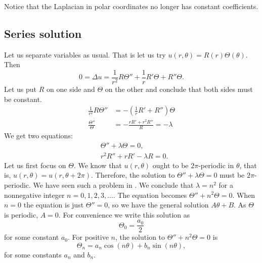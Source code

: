 Notice that the Laplacian in polar coordinates no longer has constant
coefficients.

\subsection{Series solution}

Let us separate variables as usual.  That is let us try
$u(r,\theta) = R(r)\Theta(\theta)$.  Then
\begin{equation*}
0 = \Delta u = 
\frac{1}{r^2} R \Theta''
+
\frac{1}{r} R' \Theta
+
R'' \Theta .
\end{equation*}
Let us put $R$ on one side and $\Theta$ on the other and conclude
that both sides must be constant.
\begin{align*}
\frac{1}{r^2} R \Theta''
& =
-
\left(\frac{1}{r} R' + R''\right) \Theta 
\\
\frac{\Theta''}{\Theta}
& =
-
\frac{r R' + r^2 R''}{R} = -\lambda
\end{align*}
We get two equations:
\begin{align*}
& \Theta'' + \lambda \Theta = 0 ,
\\
& r^2 R'' + r R' -\lambda R = 0.
\end{align*}
Let us first focus on $\Theta$.  We know that $u(r,\theta)$ ought to be
$2\pi$-periodic in $\theta$, that is,
$u(r,\theta) = u(r,\theta+2\pi)$.  Therefore, the solution to
$\Theta'' + \lambda \Theta = 0$ must be $2\pi$-periodic.
We have seen such a problem in .
We conclude
that
$\lambda = n^2$ for a
nonnegative integer $n=0,1,2,3,\ldots$.  The equation becomes
$\Theta'' + n^2 \Theta = 0$.  When $n=0$ the equation is just
$\Theta'' = 0$, so we have the general solution $A \theta + B$.  As
$\Theta$ is periodic,
$A=0$.
For convenience we write this solution as
\begin{equation*}
\Theta_0 = \frac{a_0}{2}
\end{equation*}
for some constant $a_0$.  For positive $n$,
the 
solution to
$\Theta'' + n^2 \Theta = 0$ is
\begin{equation*}
\Theta_n = a_n \cos(n\theta) + b_n \sin(n\theta) ,
\end{equation*}
for some constants $a_n$ and $b_n$.

